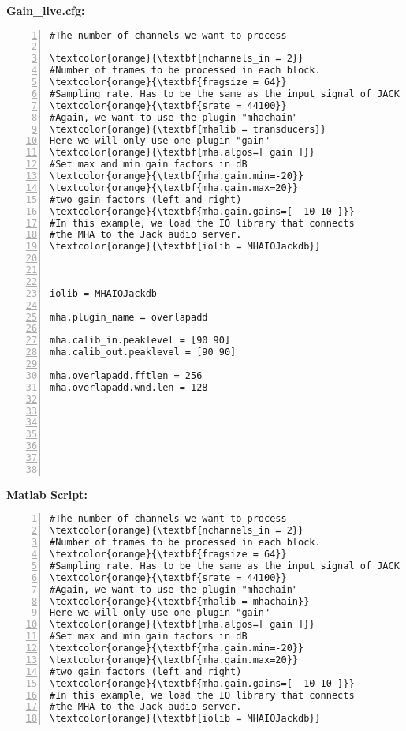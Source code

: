 \documentclass[11pt,a4paper,twoside]{article}
\newcommand{\+}{\discretionary{\mbox{\scriptsize$\hookleftarrow$}}{}{}}
\begin{document}
\begin{enumerate}
\textbf{Gain\_live.cfg:}

\begin{Verbatim}[frame=single,numbers=left,commandchars=\\\{\}]
#The number of channels we want to process

\textcolor{orange}{\textbf{nchannels_in = 2}}
#Number of frames to be processed in each block.
\textcolor{orange}{\textbf{fragsize = 64}}
#Sampling rate. Has to be the same as the input signal of JACK
\textcolor{orange}{\textbf{srate = 44100}}
#Again, we want to use the plugin "mhachain"
\textcolor{orange}{\textbf{mhalib = transducers}}
Here we will only use one plugin "gain"
\textcolor{orange}{\textbf{mha.algos=[ gain ]}}
#Set max and min gain factors in dB
\textcolor{orange}{\textbf{mha.gain.min=-20}}
\textcolor{orange}{\textbf{mha.gain.max=20}}
#two gain factors (left and right)
\textcolor{orange}{\textbf{mha.gain.gains=[ -10 10 ]}}
#In this example, we load the IO library that connects
#the MHA to the Jack audio server.
\textcolor{orange}{\textbf{iolib = MHAIOJackdb}}



iolib = MHAIOJackdb

mha.plugin_name = overlapadd

mha.calib_in.peaklevel = [90 90]
mha.calib_out.peaklevel = [90 90]

mha.overlapadd.fftlen = 256
mha.overlapadd.wnd.len = 128








\end{Verbatim} 

\textbf{Matlab Script:}

\begin{Verbatim}[frame=single,numbers=left,commandchars=\\\{\}]
#The number of channels we want to process
\textcolor{orange}{\textbf{nchannels_in = 2}}
#Number of frames to be processed in each block.
\textcolor{orange}{\textbf{fragsize = 64}}
#Sampling rate. Has to be the same as the input signal of JACK
\textcolor{orange}{\textbf{srate = 44100}}
#Again, we want to use the plugin "mhachain"
\textcolor{orange}{\textbf{mhalib = mhachain}}
Here we will only use one plugin "gain"
\textcolor{orange}{\textbf{mha.algos=[ gain ]}}
#Set max and min gain factors in dB
\textcolor{orange}{\textbf{mha.gain.min=-20}}
\textcolor{orange}{\textbf{mha.gain.max=20}}
#two gain factors (left and right)
\textcolor{orange}{\textbf{mha.gain.gains=[ -10 10 ]}}
#In this example, we load the IO library that connects
#the MHA to the Jack audio server.
\textcolor{orange}{\textbf{iolib = MHAIOJackdb}}
\end{Verbatim} 















\end{enumerate}
\newpage
\end{document}
